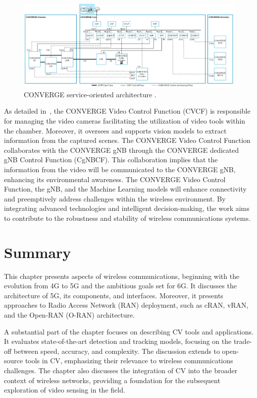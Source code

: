 \begin{figure}[H]
    \centering
    \includegraphics[width=1\linewidth]{figures/arch_converge}
    \caption[CONVERGE service-oriented architecture] {CONVERGE service-oriented architecture \cite{converge2023_specs}.}
    \label{fig:converge_arch}
\end{figure}

As detailed in~\cite{converge2023_specs}, the CONVERGE Video Control Function (CVCF) is responsible for managing the video cameras facilitating the utilization
of video tools within the chamber.
Moreover, it oversees and supports
vision models to extract information from the captured scenes.
The CONVERGE Video Control Function collaborates with the CONVERGE gNB through the CONVERGE dedicated gNB Control Function (CgNBCF). This collaboration implies that the information from the video will be communicated to the CONVERGE gNB, enhancing its environmental awareness.
The CONVERGE Video Control Function, the gNB, and the Machine Learning models will
enhance connectivity and preemptively address challenges within the wireless environment.
By integrating advanced technologies and intelligent decision-making, the work
aims to contribute to the robustness and stability of wireless communications systems.


\section{Summary}\label{sec:Summary_SOA}
This chapter presents aspects of wireless communications, beginning with the evolution from 4G to 5G and the ambitious goals set for 6G.
It discusses the architecture of 5G, its components, and interfaces.
Moreover, it presents approaches to Radio Access Network (RAN) deployment, such as cRAN, vRAN, and the Open-RAN (O-RAN) architecture.

A substantial part of the chapter focuses on describing CV tools and applications.
It evaluates state-of-the-art detection and tracking models, focusing on the trade-off between speed, accuracy, and complexity.
The discussion extends to open-source tools in CV, emphasizing their relevance to wireless communications challenges.
The chapter also discusses the integration of CV into the broader context of wireless networks, providing a foundation for the subsequent exploration of video sensing in the field.

